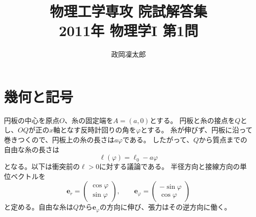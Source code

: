 \documentclass[11pt,a4paper]{article}
\title{物理工学専攻 院試解答集\\2011年 物理学I 第1問}
\author{政岡凜太郎}
\date{}
\begin{document}
\maketitle

\section*{幾何と記号}
円板の中心を原点$O$、糸の固定端を$A=(a,0)$とする。
円板と糸の接点を$Q$とし、$OQ$が正の$x$軸となす反時計回りの角を$\varphi$とする。
糸が伸びず、円板に沿って巻きつくので、円板上の糸の長さは$a\varphi$である。
したがって、$Q$から質点までの自由な糸の長さは
\begin{equation}
  \ell(\varphi)=\ell_0-a\varphi
  \label{eq:length}
\end{equation}
となる。以下は衝突前の$\ell>0$に対する議論である。
半径方向と接線方向の単位ベクトルを
\begin{equation}
  \boldsymbol{e}_r=\begin{pmatrix}\cos\varphi\\\sin\varphi\end{pmatrix},
  \qquad
  \boldsymbol{e}_{\varphi}=\begin{pmatrix}-\sin\varphi\\\cos\varphi\end{pmatrix}
\end{equation}
と定める。自由な糸は$Q$から$\boldsymbol{e}_{\varphi}$の方向に伸び、張力はその逆方向に働く。
\end{document}
